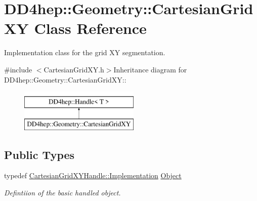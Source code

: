 \hypertarget{class_d_d4hep_1_1_geometry_1_1_cartesian_grid_x_y}{
\section{DD4hep::Geometry::CartesianGridXY Class Reference}
\label{class_d_d4hep_1_1_geometry_1_1_cartesian_grid_x_y}
}


Implementation class for the grid XY segmentation.  


{\ttfamily \#include $<$CartesianGridXY.h$>$}Inheritance diagram for DD4hep::Geometry::CartesianGridXY::\begin{figure}[H]
\begin{center}
\leavevmode
\includegraphics[height=2cm]{class_d_d4hep_1_1_geometry_1_1_cartesian_grid_x_y}
\end{center}
\end{figure}
\subsection*{Public Types}
\begin{DoxyCompactItemize}
\item 
typedef \hyperlink{class_t}{CartesianGridXYHandle::Implementation} \hyperlink{class_d_d4hep_1_1_geometry_1_1_cartesian_grid_x_y_ab59ffe7391d8eb8e0b922e7965272808}{Object}
\begin{DoxyCompactList}\small\item\em Defintiion of the basic handled object. \item\end{DoxyCompactList}\end{DoxyCompactItemize}
